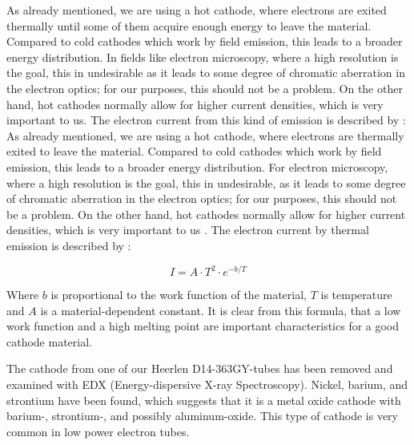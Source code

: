 As already mentioned, we are using a hot cathode, where electrons are exited thermally until some of them acquire enough energy to leave the material. Compared to cold cathodes which work by field emission, this leads to a broader energy distribution. In fields like electron microscopy, where a high resolution is the goal, this in undesirable as it leads to some degree of chromatic aberration in the electron optics; for our purposes, this should not be a problem. On the other hand, hot cathodes normally allow for higher current densities, which is very important to us. The  electron current from this kind of emission is described by \cite[chp 3.2.3]{Whitaker}: 
As already mentioned, we are using a hot cathode, where electrons are thermally exited  to leave the material. Compared to cold cathodes which work by field emission, this leads to a broader energy distribution. For electron microscopy, where a high resolution is the goal, this in undesirable, as it leads to some degree of chromatic aberration in the electron optics; for our purposes, this should not be a problem. On the other hand, hot cathodes normally allow for higher current densities, which is very important to us . The  electron current by thermal emission is described by \cite[chp 3.2.3]{Whitaker}: 

\begin{equation}\label{eq:thermionic_current}
I=A\cdot T^2 \cdot e^{-b/T}
\end{equation}

Where $b$ is proportional to the work function of the material, $T$ is temperature and $A$ is a material-dependent constant. It is clear from this formula, that a low work function and a high melting point are important characteristics for a good cathode material. 

The cathode from one of our Heerlen D14-363GY-tubes has been removed and examined with EDX (Energy-dispersive X-ray Spectroscopy). Nickel, barium, and strontium have been found, which suggests that it is a metal oxide cathode with barium-, strontium-, and possibly aluminum-oxide. This type of cathode is very common in low power electron tubes.



